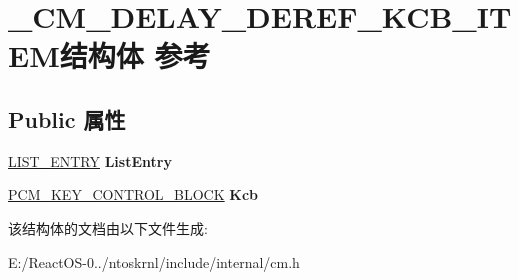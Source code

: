 \hypertarget{struct___c_m___d_e_l_a_y___d_e_r_e_f___k_c_b___i_t_e_m}{}\section{\+\_\+\+C\+M\+\_\+\+D\+E\+L\+A\+Y\+\_\+\+D\+E\+R\+E\+F\+\_\+\+K\+C\+B\+\_\+\+I\+T\+E\+M结构体 参考}
\label{struct___c_m___d_e_l_a_y___d_e_r_e_f___k_c_b___i_t_e_m}
\subsection*{Public 属性}
\begin{DoxyCompactItemize}
\item 
\mbox{\label{struct___c_m___d_e_l_a_y___d_e_r_e_f___k_c_b___i_t_e_m_add0a7a28389fbe33ff81808ac86d33f4}} 
\hyperlink{struct___l_i_s_t___e_n_t_r_y}{L\+I\+S\+T\+\_\+\+E\+N\+T\+RY} {\bfseries List\+Entry}
\item 
\mbox{\label{struct___c_m___d_e_l_a_y___d_e_r_e_f___k_c_b___i_t_e_m_ac63c3fb182705514a293c81bbf9afb76}} 
\hyperlink{struct___c_m___k_e_y___c_o_n_t_r_o_l___b_l_o_c_k}{P\+C\+M\+\_\+\+K\+E\+Y\+\_\+\+C\+O\+N\+T\+R\+O\+L\+\_\+\+B\+L\+O\+CK} {\bfseries Kcb}
\end{DoxyCompactItemize}


该结构体的文档由以下文件生成\+:\begin{DoxyCompactItemize}
\item 
E\+:/\+React\+O\+S-\/0../ntoskrnl/include/internal/cm.\+h\end{DoxyCompactItemize}
